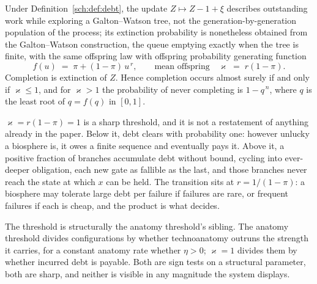 \begin{proposition} \label{sch:prop:gw} Under Definition~\ref{sch:def:debt}, the update $Z \mapsto Z - 1 + \xi$ describes outstanding work while exploring a Galton--Watson tree, not the generation-by-generation population of the process; its extinction probability is nonetheless obtained from the Galton--Watson construction, the queue emptying exactly when the tree is finite, with the same offspring law with offspring probability generating function
\begin{equation}\label{sch:eq:pgf}
f(u)\;=\;\pi+(1-\pi)\,u^{\,r},
\qquad\text{mean offspring}\quad \varkappa\;=\;r(1-\pi).
\end{equation}
Completion is extinction of $Z$. Hence completion occurs almost surely
if and only if $\varkappa\le1$, and for $\varkappa>1$ the probability of never
completing is $1-q^{\,n}$, where $q$ is the least root of $q=f(q)$ in
$[0,1]$.
\end{proposition}

\begin{remark}
\label{sch:rem:criticality}
$\varkappa=r(1-\pi)=1$ is a sharp threshold, and it is not a restatement of
anything already in the paper. Below it, debt clears with probability one: however unlucky a biosphere
is, it owes a finite sequence and eventually pays it. Above it, a
positive fraction of branches accumulate debt without bound, cycling
into ever-deeper obligation, each new gate as fallible as the last, and those branches never reach the state at which $x$ can be held. The
transition sits at $r=1/(1-\pi)$: a biosphere may tolerate large debt
per failure if failures are rare, or frequent failures if each is cheap,
and the product is what decides.

The threshold is structurally the anatomy threshold's sibling. The anatomy
threshold divides configurations by whether technoanatomy outruns the
strength it carries, for a constant anatomy rate whether $\eta>0$; $\varkappa=1$
divides them by whether incurred debt is payable. Both are sign tests on
a structural parameter, both are sharp, and neither is visible in any
magnitude the system displays.
\end{remark}

